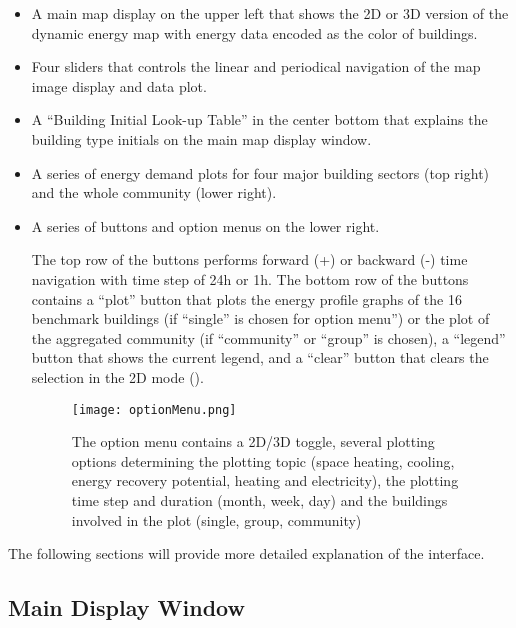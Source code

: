 \begin{itemize}
\item A main map display on the upper left that shows the 2D or 3D
  version of the dynamic energy map with energy data encoded as the
  color of buildings. 

\item Four sliders that controls the linear and periodical navigation
  of the map image display and data plot.

\item A ``Building Initial Look-up Table'' in the center bottom that
  explains the building type initials on the main map display window.
\item A series of energy demand plots for four major building sectors
  (top right) and the whole community (lower right).  
\item A series of buttons and option menus on the lower right. 

  The top row of the buttons performs forward (+) or backward (-) time
  navigation with time step of 24h or 1h. The bottom row of the
  buttons contains a ``plot'' button that plots the energy profile
  graphs of the 16 benchmark buildings (if ``single'' is chosen for
  option menu'') or the plot of the aggregated community (if
  ``community'' or ``group'' is chosen), a ``legend'' button that
  shows the current legend, and a ``clear'' button that clears the
  selection in the 2D mode ().
  
  \begin{figure}[h!]
    \centering
    \texttt{[image: optionMenu.png]}
    \caption[Option Menu]{The option menu contains a 2D/3D toggle,
      several plotting options determining the plotting topic (space
      heating, cooling, energy recovery potential, heating and
      electricity), the plotting time step and duration (month, week,
      day) and the buildings involved in the plot (single, group, community)}
    \label{fig:optionMenu}
  \end{figure}

\end{itemize}

The following sections will provide more detailed explanation of the
interface.

\subsection {Main Display Window} \label{2d3d} 

